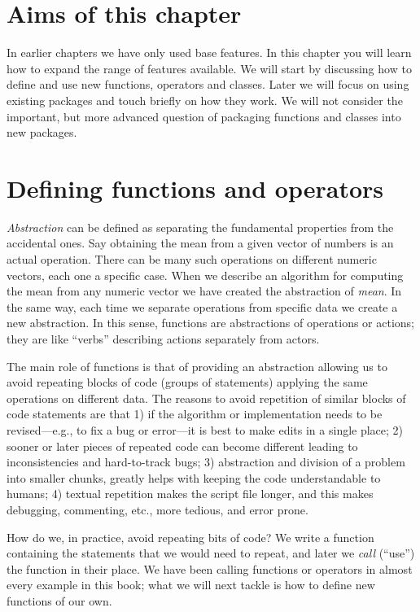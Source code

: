 \documentclass[krantz2]{krantz}\usepackage{knitr}
\begin{document}
\section{Aims of this chapter}

In earlier chapters we have only used base \Rlang features. In this chapter you will learn how to expand the range of features available. We will start by discussing how to define and use new functions, operators and classes. Later we will focus on using existing packages and touch briefly on how they work. We will not consider the important, but more advanced question of packaging functions and classes into new \Rlang packages.

\section{Defining functions and operators}\label{sec:script:functions}

\emph{Abstraction} can be defined as separating the fundamental properties from the accidental ones. Say obtaining the mean from a given vector of numbers is an actual operation. There can be many such operations on different numeric vectors, each one a specific case. When we describe an algorithm for computing the mean from any numeric vector we have created the abstraction of \emph{mean}. In the same way, each time we separate operations from specific data we create a new abstraction. In this sense, functions are abstractions of operations or actions; they are like ``verbs'' describing actions separately from actors.

The main role of functions is that of providing an abstraction allowing us to avoid repeating blocks of code (groups of statements) applying the same operations on different data. The reasons to avoid repetition of similar blocks of code statements are that 1) if the algorithm or implementation needs to be revised---e.g., to fix a bug or error---it is best to make edits in a single place; 2) sooner or later pieces of repeated code can become different leading to inconsistencies and hard-to-track bugs; 3) abstraction and division of a problem into smaller chunks, greatly helps with keeping the code understandable to humans; 4) textual repetition makes the script file longer, and this makes debugging, commenting, etc., more tedious, and error prone.

How do we, in practice, avoid repeating bits of code? We write a function containing the statements that we would need to repeat, and later we \emph{call} (``use'') the function in their place. We have been calling \Rlang functions or operators in almost every example in this book; what we will next tackle is how to define new functions of our own.
\end{document}
